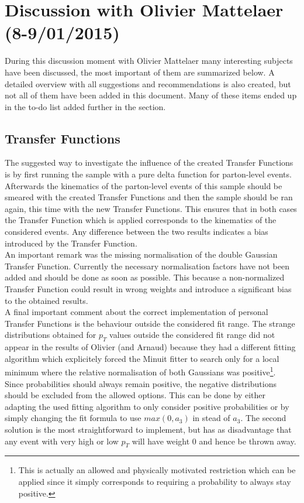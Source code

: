 \section{Discussion with Olivier Mattelaer (8-9/01/2015)}

During this discussion moment with Olivier Mattelaer many interesting subjects have been discussed, the most important of them are summarized below. A detailed overview with all suggestions and recommendations is also created, but not all of them have been added in this document. Many of these items ended up in the to-do list added further in the section.

\subsection{Transfer Functions}

The suggested way to investigate the influence of the created Transfer Functions is by first running the sample with a pure delta function for parton-level events. Afterwards the kinematics of the parton-level events of this sample should be smeared with the created Transfer Functions and then the sample should be ran again, this time with the new Transfer Functions. This ensures that in both cases the Transfer Function which is applied corresponds to the kinematics of the considered events. Any difference between the two results indicates a bias introduced by the Transfer Function.\\

An important remark was the missing normalisation of the double Gaussian Transfer Function. Currently the necessary normalisation factors have not been added and should be done as soon as possible. This because a non-normalized Transfer Function could result in wrong weights and introduce a significant bias to the obtained results.\\

A final important comment about the correct implementation of personal Transfer Functions is the behaviour outside the considered fit range. The strange distributions obtained for $p_T$ values outside the considered fit range did not appear in the results of Olivier (and Arnaud) because they had a different fitting algorithm which explicitely forced the Minuit fitter to search only for a local minimum where the relative normalisation of both Gaussians was positive\footnote{This is actually an allowed and physically motivated restriction which can be applied since it simply corresponds to requiring a probability to always stay positive.}.\\
Since probabilities should always remain positive, the negative distributions should be excluded from the allowed options. This can be done by either adapting the used fitting algorithm to only consider positive probabilities or by simply changing the fit formula to use $max(0,a_{3})$ in stead of $a_{3}$. The second solution is the most straightforward to implement, but has as disadvantage that any event with very high or low $p_T$ will have weight $0$ and hence be thrown away.

